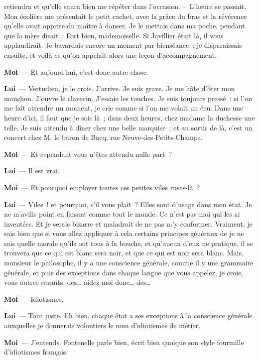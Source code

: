 \documentclass[french,twoside]{book} %
\newcommand{\labelchar}[1]{\textbf{\color{rubric} #1}}
\begin{document}
retiendra et qu’elle saura bien me répéter dans l’occasion. – L’heure se passait. Mon écolière me présentait le petit cachet, avec la grâce du bras et la révérence qu’elle avait apprise du maître à danser. Je le mettais dans ma poche, pendant que la mère disait : Fort bien, mademoiselle. Si Javillier était là, il vous applaudirait. Je bavardais encore un moment par bienséance ; je disparaissais ensuite, et voilà ce qu’on appelait alors une leçon d’accompagnement.\par
\labelchar{Moi} — Et aujourd’hui, c’est donc autre chose.\par
\labelchar{Lui} — Vertudieu, je le crois. J’arrive. Je suis grave. Je me hâte d’ôter mon manchon. J’ouvre le clavecin. J’essaie les touches. Je suis toujours pressé : si l’on me fait attendre un moment, je crie comme si l’on me volait un écu. Dans une heure d’ici, il faut que je sois là ; dans deux heures, chez madame la duchesse une telle. Je suis attendu à dîner chez une belle marquise ; et au sortir de là, c’est un concert chez M. le baron de Bacq, rue Neuve-des-Petits-Champs.\par
\labelchar{Moi} — Et cependant vous n’êtes attendu nulle part ?\par
\labelchar{Lui} — Il est vrai.\par
\labelchar{Moi} — Et pourquoi employer toutes ces petites viles ruses-là ?\par
\labelchar{Lui} — Viles ! et pourquoi, s’il vous plaît ? Elles sont d’usage dans mon état. Je ne m’avilis point en faisant comme tout le monde. Ce n’est pas moi qui les ai inventées. Et je serais bizarre et maladroit de ne pas m’y conformer. Vraiment, je sais bien que si vous allez appliquer à cela certains principes généraux de je ne sais quelle morale qu’ils ont tous à la bouche, et qu’aucun d’eux ne pratique, il se trouvera que ce qui est blanc sera noir, et que ce qui est noir sera blanc. Mais, monsieur le philosophe, il y a une conscience générale, comme il y une grammaire générale, et puis des exceptions dans chaque langue que vous appelez, je crois, vous autres savants, des… aidez-moi donc… des…\par
\labelchar{Moi} — Idiotismes.\par
\labelchar{Lui} — Tout juste. Eh bien, chaque état a ses exceptions à la conscience générale auxquelles je donnerais volontiers le nom d’idiotismes de métier.\par
\labelchar{Moi} — J’entends. Fontenelle parle bien, écrit bien quoique son style fourmille d’idiotismes français.\par
\end{document}
